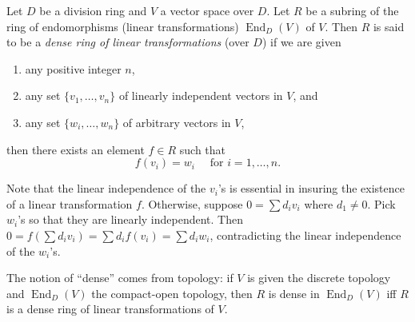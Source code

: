\documentclass[12pt]{article}
\begin{document}
Let $D$ be a division ring and $V$ a vector space over $D$.  Let $R$ be a subring of the ring of endomorphisms (linear transformations) $\operatorname{End}_D(V)$ of $V$.  Then $R$ is said to be a \emph{dense ring of linear transformations} (over $D$) if we are given 
\begin{enumerate}
\item any positive integer $n$, 
\item any set $\lbrace v_1,\ldots,v_n\rbrace$ of linearly independent vectors in $V$, and 
\item any set $\lbrace w_i,\ldots,w_n\rbrace$ of arbitrary vectors in $V$,
\end{enumerate}
then there exists an element $f\in R$ such that
$$f(v_i)=w_i\quad\mbox{ for }i=1,\ldots,n.$$

Note that the linear independence of the $v_i$'s is essential in insuring the existence of a linear transformation $f$.  Otherwise, suppose $0=\sum d_iv_i$ where $d_1\neq 0$.  Pick $w_i$'s so that they are linearly independent.  Then $0=f(\sum d_iv_i)=\sum d_if(v_i)=\sum d_iw_i$, contradicting the linear independence of the $w_i$'s.

The notion of ``dense'' comes from topology: if $V$ is given the discrete topology and $\operatorname{End}_D(V)$ the compact-open topology, then $R$ is dense in $\operatorname{End}_D(V)$ iff $R$ is a dense ring of linear transformations of $V$.
\end{document}
